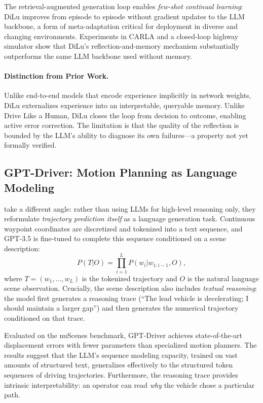 \documentclass[12pt, a4paper]{article}
\begin{document}
The retrieval-augmented generation loop enables \emph{few-shot continual learning}:
DiLu improves from episode to episode without gradient updates to the LLM backbone,
a form of meta-adaptation critical for deployment in diverse and changing
environments. Experiments in CARLA and a closed-loop highway simulator show that
DiLu's reflection-and-memory mechanism substantially outperforms the same LLM
backbone used without memory.

\paragraph{Distinction from Prior Work.}
Unlike end-to-end models that encode experience implicitly in network weights,
DiLu externalizes experience into an interpretable, queryable memory. Unlike
Drive Like a Human, DiLu closes the loop from decision to outcome, enabling
active error correction. The limitation is that the quality of the reflection is
bounded by the LLM's ability to diagnose its own failures---a property not yet
formally verified.

\subsection{GPT-Driver: Motion Planning as Language Modeling}
\label{sec:gptdriver}

\citet{mao2023gpt} take a different angle: rather than using LLMs for high-level
reasoning only, they reformulate \emph{trajectory prediction itself} as a language
generation task. Continuous waypoint coordinates are discretized and tokenized
into a text sequence, and GPT-3.5 is fine-tuned to complete this sequence
conditioned on a scene description:
\begin{equation}
  P(T | O) = \prod_{i=1}^{L} P(w_i | w_{1:i-1}, O),
  \label{eq:gpt_driver}
\end{equation}
where $T = (w_1, \dots, w_L)$ is the tokenized trajectory and $O$ is the
natural language scene observation. Crucially, the scene description also
includes \emph{textual reasoning}: the model first generates a reasoning trace
(``The lead vehicle is decelerating; I should maintain a larger gap'') and then
generates the numerical trajectory conditioned on that trace.

Evaluated on the nuScenes benchmark, GPT-Driver achieves state-of-the-art
displacement errors with fewer parameters than specialized motion planners.
The results suggest that the LLM's sequence modeling capacity, trained on vast
amounts of structured text, generalizes effectively to the structured token
sequences of driving trajectories. Furthermore, the reasoning trace provides
intrinsic interpretability: an operator can read \emph{why} the vehicle chose a
particular path.
\end{document}
